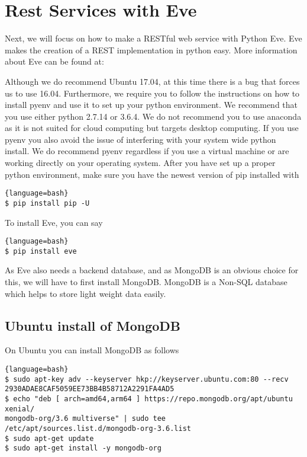 \section{Rest Services with Eve}
\label{s:eve-intro}

Next, we will focus on how to make a RESTful web service with Python
Eve. Eve makes the creation of a REST implementation in python
easy. More information about Eve can be found at:


\begin{WARNING}

Although we do recommend Ubuntu 17.04, at this time there is a bug
that forces us to use 16.04. Furthermore, we require you to follow the
instructions on how to install pyenv and use it to set up your python
environment. We recommend that you use either python 2.7.14 or 3.6.4.
We do not recommend you to use anaconda as it is not suited for cloud
computing but targets desktop computing. If you use pyenv you also
avoid the issue of interfering with your system wide python
install. We do recommend pyenv regardless if you use a virtual machine
or are working directly on your operating system. After you have set
up a proper python environment, make sure you have the newest version
of pip installed with 

\smallskip

\begin{lstlisting}{language=bash}
$ pip install pip -U
\end{lstlisting}
\end{WARNING}

To install Eve, you can say 

\begin{lstlisting}{language=bash}
$ pip install eve
\end{lstlisting}

As Eve also needs a backend database, and as MongoDB is an obvious
choice for this, we will have to first install MongoDB.  MongoDB is a Non-SQL
database which helps to store light weight data easily.

\subsection{Ubuntu install of MongoDB}
On Ubuntu you can install MongoDB as follows

\begin{lstlisting}{language=bash}
$ sudo apt-key adv --keyserver hkp://keyserver.ubuntu.com:80 --recv 2930ADAE8CAF5059EE73BB4B58712A2291FA4AD5
$ echo "deb [ arch=amd64,arm64 ] https://repo.mongodb.org/apt/ubuntu xenial/
mongodb-org/3.6 multiverse" | sudo tee /etc/apt/sources.list.d/mongodb-org-3.6.list
$ sudo apt-get update
$ sudo apt-get install -y mongodb-org
\end{lstlisting}

